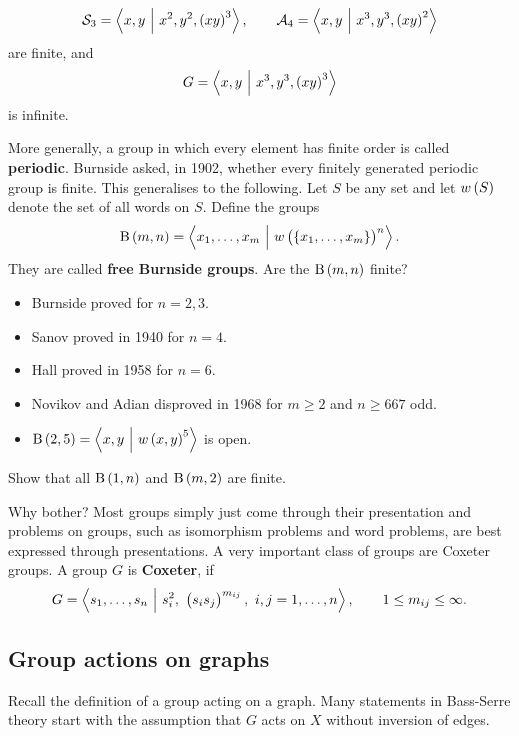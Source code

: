\begin{example*}
$$ \SSS_3 = \abr{x, y \st x^2, y^2, \br{xy}^3}, \qquad \AAA_4 = \abr{x, y \st x^3, y^3, \br{xy}^2} $$
are finite, and
$$ G = \abr{x, y \st x^3, y^3, \br{xy}^3} $$
is infinite.
\end{example*}

\pagebreak

\begin{remark}
More generally, a group in which every element has finite order is called \textbf{periodic}. Burnside asked, in 1902, whether every finitely generated periodic group is finite. This generalises to the following. Let $ S $ be any set and let $ w\br{S} $ denote the set of all words on $ S $. Define the groups
$$ \B\br{m, n} = \abr{x_1, \dots, x_m \st w\br{\cbr{x_1, \dots, x_m}}^n}. $$
They are called \textbf{free Burnside groups}. Are the $ \B\br{m, n} $ finite?
\begin{itemize}
\item Burnside proved for $ n = 2, 3 $.
\item Sanov proved in 1940 for $ n = 4 $.
\item Hall proved in 1958 for $ n = 6 $.
\item Novikov and Adian disproved in 1968 for $ m \ge 2 $ and $ n \ge 667 $ odd.
\item $ \B\br{2, 5} = \abr{x, y \st w\br{x, y}^5} $ is open.
\end{itemize}
\end{remark}

\begin{exercise}
Show that all $ \B\br{1, n} $ and $ \B\br{m, 2} $ are finite.
\end{exercise}

Why bother? Most groups simply just come through their presentation and problems on groups, such as isomorphism problems and word problems, are best expressed through presentations. A very important class of groups are Coxeter groups. A group $ G $ is \textbf{Coxeter}, if
$$ G = \abr{s_1, \dots, s_n \st s_i^2, \ \br{s_is_j}^{m_{ij}}, \ i, j = 1, \dots, n}, \qquad 1 \le m_{ij} \le \infty. $$

\subsection{Group actions on graphs}

Recall the definition of a group acting on a graph. Many statements in Bass-Serre theory start with the assumption that $ G $ acts on $ X $ without inversion of edges.

